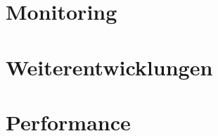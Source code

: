 \section{Monitoring}\label{sec:monitoring-verfahren}



\section{Weiterentwicklungen}\label{sec:weiterentwicklungen}


\section{Performance}\label{sec:performance}